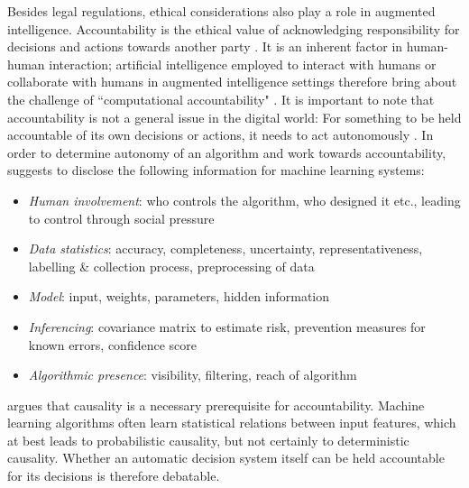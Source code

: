 Besides legal regulations, ethical considerations also play a role in augmented intelligence. Accountability is the ethical value of acknowledging responsibility for decisions and actions towards another party \cite{baldoni2016computational}. It is an inherent factor in human-human interaction; artificial intelligence employed to interact with humans or collaborate with humans in augmented intelligence settings therefore bring about the challenge of ``computational accountability" \cite{baldoni2016computational}. It is important to note that accountability is not a general issue in the digital world: For something to be held accountable of its own decisions or actions, it needs to act autonomously \cite{baldoni2016computational}. In order to determine autonomy of an algorithm and work towards accountability, \cite{diakopoulos2016accountability} suggests to disclose the following information for machine learning systems: 
\begin{itemize}
	\item \textit{Human involvement}: who controls the algorithm, who designed it etc., leading to control through social pressure
	\item \textit{Data statistics}: accuracy, completeness, uncertainty, representativeness, labelling \& collection process, preprocessing of data
	\item \textit{Model}: input, weights, parameters, hidden information
	\item \textit{Inferencing}: covariance matrix to estimate risk, prevention measures for known errors, confidence score 
	\item \textit{Algorithmic presence}: visibility, filtering, reach of algorithm
\end{itemize}
\cite{baldoni2016computational} argues that causality is a necessary prerequisite for accountability. Machine learning algorithms often learn statistical relations between input features, which at best leads to probabilistic causality, but not certainly to deterministic causality. Whether an automatic decision system itself can be held accountable for its decisions is therefore debatable.






